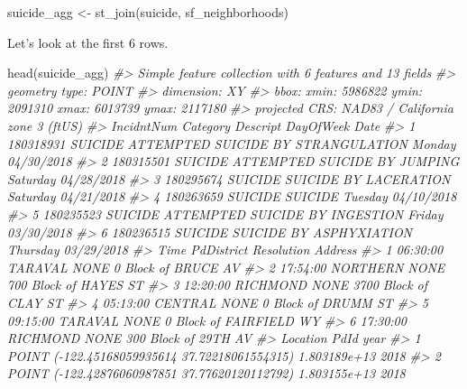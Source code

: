 \documentclass[
  12pt,
]{book}
\newenvironment{Shaded}{\begin{snugshade}}{\end{snugshade}}
\newcommand{\CommentTok}[1]{\textcolor[rgb]{0.37,0.37,0.37}{\textit{#1}}}
\newcommand{\FunctionTok}[1]{\textcolor[rgb]{0,0,0}{#1}}
\newcommand{\NormalTok}[1]{#1}
\newcommand{\OtherTok}[1]{\textcolor[rgb]{0.37,0.37,0.37}{#1}}
\begin{document}
\begin{Shaded}
\begin{Highlighting}[]
\NormalTok{suicide\_agg }\OtherTok{\textless{}{-}} \FunctionTok{st\_join}\NormalTok{(suicide, sf\_neighborhoods)}
\end{Highlighting}
\end{Shaded}

Let's look at the first 6 rows.

\begin{Shaded}
\begin{Highlighting}[]
\FunctionTok{head}\NormalTok{(suicide\_agg)}
\CommentTok{\#\textgreater{} Simple feature collection with 6 features and 13 fields}
\CommentTok{\#\textgreater{} geometry type:  POINT}
\CommentTok{\#\textgreater{} dimension:      XY}
\CommentTok{\#\textgreater{} bbox:           xmin: 5986822 ymin: 2091310 xmax: 6013739 ymax: 2117180}
\CommentTok{\#\textgreater{} projected CRS:  NAD83 / California zone 3 (ftUS)}
\CommentTok{\#\textgreater{}   IncidntNum Category                           Descript DayOfWeek       Date}
\CommentTok{\#\textgreater{} 1  180318931  SUICIDE ATTEMPTED SUICIDE BY STRANGULATION    Monday 04/30/2018}
\CommentTok{\#\textgreater{} 2  180315501  SUICIDE       ATTEMPTED SUICIDE BY JUMPING  Saturday 04/28/2018}
\CommentTok{\#\textgreater{} 3  180295674  SUICIDE              SUICIDE BY LACERATION  Saturday 04/21/2018}
\CommentTok{\#\textgreater{} 4  180263659  SUICIDE                            SUICIDE   Tuesday 04/10/2018}
\CommentTok{\#\textgreater{} 5  180235523  SUICIDE     ATTEMPTED SUICIDE BY INGESTION    Friday 03/30/2018}
\CommentTok{\#\textgreater{} 6  180236515  SUICIDE            SUICIDE BY ASPHYXIATION  Thursday 03/29/2018}
\CommentTok{\#\textgreater{}       Time PdDistrict Resolution                 Address}
\CommentTok{\#\textgreater{} 1 06:30:00    TARAVAL       NONE     0 Block of BRUCE AV}
\CommentTok{\#\textgreater{} 2 17:54:00   NORTHERN       NONE   700 Block of HAYES ST}
\CommentTok{\#\textgreater{} 3 12:20:00   RICHMOND       NONE   3700 Block of CLAY ST}
\CommentTok{\#\textgreater{} 4 05:13:00    CENTRAL       NONE     0 Block of DRUMM ST}
\CommentTok{\#\textgreater{} 5 09:15:00    TARAVAL       NONE 0 Block of FAIRFIELD WY}
\CommentTok{\#\textgreater{} 6 17:30:00   RICHMOND       NONE    300 Block of 29TH AV}
\CommentTok{\#\textgreater{}                                         Location         PdId year}
\CommentTok{\#\textgreater{} 1  POINT ({-}122.45168059935614 37.72218061554315) 1.803189e+13 2018}
\CommentTok{\#\textgreater{} 2  POINT ({-}122.42876060987851 37.77620120112792) 1.803155e+13 2018}

\end{Highlighting}
\end{Shaded}
\end{document}
